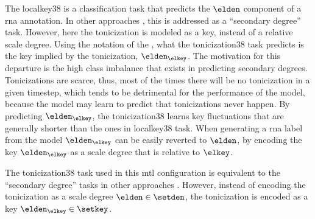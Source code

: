 

The \gls{localkey38} is a classification task that predicts
the $\elden$ component of a \gls{rna} annotation. In other
approaches \parencite{chen2021attend,micchi2021deep}, this
is addressed as a ``secondary degree'' task. However, here
the tonicization is modeled as a key, instead of a relative
scale degree. Using the notation of the
, what
the \gls{tonicization38} task predicts is the key implied by
the tonicization, $\elden_{\elkey}$. The motivation for this
departure is the high class imbalance that exists in
predicting secondary degrees. Tonicizations are scarce,
thus, most of the times there will be no tonicization in a
given timestep, which tends to be detrimental for the
performance of the model, because the model may learn to
predict that tonicizations never happen. By predicting
$\elden_{\elkey}$, the \gls{tonicization38} learns key
fluctuations that are generally shorter than the ones in
\gls{localkey38} task. When generating a \gls{rna} label
from the model $\elden_{\elkey}$ can be easily reverted to
$\elden$, by encoding the key $\elden_{\elkey}$ as a scale
degree that is relative to $\elkey$. 

The \gls{tonicization38} task used in this \gls{mtl}
configuration is equivalent to the ``secondary degree''
tasks in other approaches
\parencite{chen2021attend,micchi2021deep}. However, instead
of encoding the tonicization as a scale degree $\elden \in
\setden$, the tonicization is encoded as a key
$\elden_\elkey \in \setkey$. 

